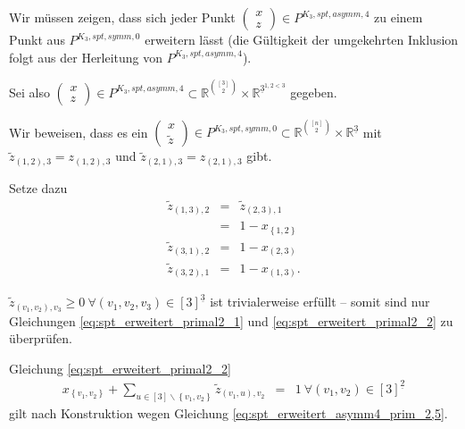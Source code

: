 \documentclass[10p,a4paper,BCOR = 12mm, DIV=15]{scrbook}
\begin{document}
\begin{bew}
Wir müssen zeigen, dass sich jeder Punkt $\left(\begin{array}{c}
x \\
z
\end{array}\right) \in P^{K_3, spt, asymm, 4}$ zu einem Punkt aus $P^{K_3, spt, symm, 0}$ erweitern lässt (die Gültigkeit der umgekehrten Inklusion folgt aus der Herleitung von $P^{K_3, spt, asymm, 4}$).

Sei also $\left(\begin{array}{c}
x \\
z
\end{array}\right) \in P^{K_3, spt, asymm, 4} \subset \mathbb{R}^{\left[3\right] \choose 2} \times \mathbb{R}^{\underline{3}^{1, 2 < 3}}$ gegeben.

Wir beweisen, dass es ein $\left(
\begin{array}{c}
x \\
\widetilde{z}
\end{array}
\right) \in P^{K_3, spt, symm, 0} \subset \mathbb{R}^{\left[n\right] \choose 2} \times \mathbb{R}^{\underline{3}}$ mit $\widetilde{z}_{\left(1, 2\right), 3} = z_{\left(1, 2\right), 3}$ und $\widetilde{z}_{\left(2, 1\right), 3} = z_{\left(2, 1\right), 3}$ gibt.

Setze dazu
\begin{eqnarray*}
\widetilde{z}_{\left(1, 3\right), 2} & = & \widetilde{z}_{\left(2, 3\right), 1} \\
& = & 1 - x_{\left\{1, 2\right\}} \\
\widetilde{z}_{\left(3, 1\right), 2} & = & 1 - x_{\left(2, 3\right)} \\
\widetilde{z}_{\left(3, 2\right), 1} & = & 1 - x_{\left(1, 3\right)}.
\end{eqnarray*}

$\widetilde{z}_{\left(v_1, v_2\right), v_3} \geq 0 \ \forall \left(v_1, v_2, v_3\right) \in \left[3\right]^{\underline{3}}$ ist trivialerweise erfüllt -- somit sind nur Gleichungen \eqref{eq:spt_erweitert_primal2_1} und \eqref{eq:spt_erweitert_primal2_2} zu überprüfen.

Gleichung \eqref{eq:spt_erweitert_primal2_2}
\begin{eqnarray*}
x_{\left\{v_1, v_2\right\}} + \sum_{u\in[3]\backslash\left\{v_1, v_2\right\}} \widetilde{z}_{\left(v_1, u\right), v_2} & = & 1\ \forall \left(v_1, v_2\right)\in [3]^{\underline{2}}
\end{eqnarray*}
gilt nach Konstruktion wegen Gleichung \eqref{eq:spt_erweitert_asymm4_prim_2,5}.


\end{bew}
\end{document}
